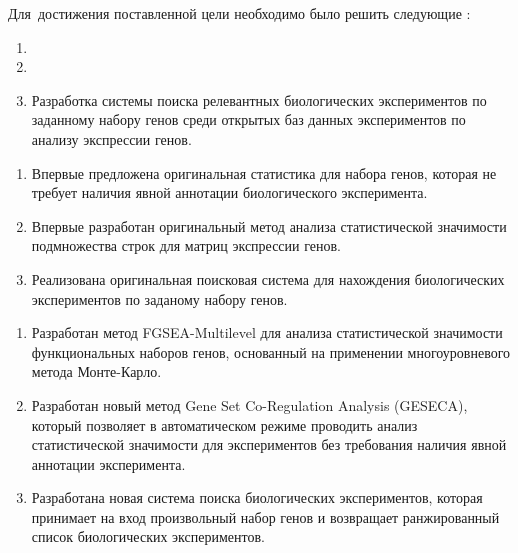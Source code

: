 
Для~достижения поставленной цели необходимо было решить следующие {\tasks}:
\begin{enumerate}[beginpenalty=10000] %
  \item {}
  \item {}
  \item Разработка системы поиска релевантных биологических экспериментов по заданному набору генов среди открытых баз данных экспериментов по анализу экспрессии генов.
\end{enumerate}


{\novelty}
\begin{enumerate}[beginpenalty=10000] %
  \item Впервые предложена оригинальная статистика для набора генов, которая не требует наличия явной аннотации биологического эксперимента.
  \item Впервые разработан оригинальный метод анализа статистической значимости  подмножества строк для матриц экспрессии генов.
  \item Реализована оригинальная поисковая система для нахождения биологических экспериментов по заданому набору генов.
\end{enumerate}

{}
\begin{enumerate}[beginpenalty=10000] %
  \item Разработан метод FGSEA-Multilevel для анализа статистической значимости функциональных наборов генов, основанный на применении многоуровневого метода Монте-Карло.
  \item Разработан новый метод Gene Set Co-Regulation Analysis (GESECA), который позволяет в автоматическом режиме проводить анализ статистической значимости для экспериментов без требования наличия явной аннотации эксперимента.
  \item Разработана новая система поиска биологических экспериментов, которая принимает на вход произвольный набор генов и возвращает ранжированный список биологических экспериментов.
\end{enumerate}



